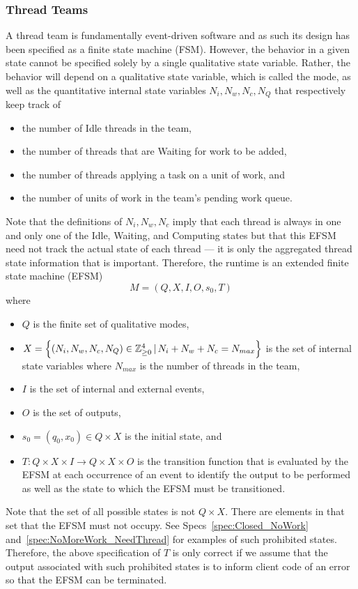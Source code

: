 \documentclass{article}
\newcommand{\Z}                 {{\mathbb Z}}
\begin{document}
\subsubsection{Thread Teams}
A thread team is fundamentally event-driven software and as such its design has
been specified as a finite state machine (FSM).  However, the behavior in a
given state cannot be specified solely by a single qualitative state variable.
Rather, the behavior will depend on a qualitative state variable, which is
called the mode, as well as the quantitative internal state variables $N_i, N_w,
N_c, N_Q$ that respectively keep track of 
\begin{itemize}
\item{the number of Idle threads in the team,}
\item{the number of threads that are Waiting for work to be added,}
\item{the number of threads applying a task on a unit of work, and}
\item{the number of units of work in the team's pending work queue.}
\end{itemize}
Note that the definitions of $N_i, N_w, N_c$ imply that each thread is
always in one and only one of the Idle, Waiting, and Computing states but that
this EFSM need not track the actual state of each thread --- it is only the
aggregated thread state information that is important.  Therefore, the runtime
is an extended finite state machine (EFSM)
\[
M = (Q, X, I, O, s_0, T)
\]
where
\begin{itemize}
\item{$Q$ is the finite set of qualitative modes,}
\item{$X = \set{(N_i, N_w, N_c, N_Q) \in \Z_{\ge 0}^4\,|\,N_i + N_w + N_c =
N_{max}}$ is the set of internal state variables where $N_{max}$ is the
number of threads in the team,}
\item{$I$ is the set of internal and external events,}
\item{$O$ is the set of outputs,}
\item{$s_0 = (q_0, x_0) \in Q \times X$ is the initial state, and}
\item{$T : Q \times X \times I \to Q \times X \times O$ is the transition
function that is evaluated by the EFSM at each occurrence of an event to
identify the output to be performed as well as the state to which the EFSM must
be transitioned.}
\end{itemize}

Note that the set of all possible states is not $Q \times X$.  There are
elements in that set that the EFSM must not occupy.  See
Specs~\ref{spec:Closed_NoWork} and~\ref{spec:NoMoreWork_NeedThread} for examples
of such prohibited states.  Therefore, the above specification of $T$ is only
correct if we assume that the output associated with such prohibited states is
to inform client code of an error so that the EFSM can be terminated.\\
\end{document}
